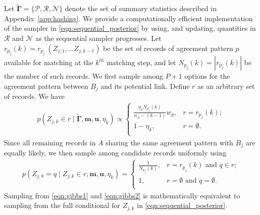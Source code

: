 \documentclass[12pt,letterpaper]{article}
\newcommand{\1}[1]{\mathbb{I}\!\left[#1\right]} %
\begin{document}
Let $\tilde{\bm{\Gamma}}=\{ \mathcal{P}, \mathcal{R},\mathcal{N}\}$ denote the set of summary statistics described in Appendix~\ref{app:hashing}. We provide a computationally efficient implementation of the sampler in \eqref{eqn:sequential_posterior} by using, and updating, quantities in $\mathcal{R}$ and $\mathcal{N}$ as the sequential sampler progresses. Let $r_{p_j}(k) = r_{p_j} \ (Z_{j, 1}, \ldots Z_{j, k-1})$ be the set of records of agreement pattern $p$ available for matching at the $k^{th}$ matching step, and let $N_{p_j}(k) = |r_{p_j}(k)|$ be the number of such records. We first sample among $P + 1$ options for the agreement pattern between $B_j$ and its potential link. Define $r$ as an arbitrary set of records. We have
\begin{align}
	\label{eqn:gibbs1}
	p\left( Z_{j, k} \in r \mid \tilde{\bm{\Gamma}}, \bm{m}, \bm{u}, \eta_k \right) \propto
	\begin{cases} 
		\frac{\eta_k N_{p_j}(k)}{n_A - (k - 1)}  w_{p},  & r = r_{p_j}(k); \\
		1- \eta_k , &  r = \emptyset. \\
	\end{cases}
\end{align}
Since all remaining records in $A$ sharing the same agreement pattern with $B_j$ are equally likely, we then sample among candidate records uniformly using
\begin{align}
	\label{eqn:gibbs2}
	p\left(Z_{j, k} = q \mid Z_{j, k} \in r, \bm{m}, \bm{u}, \eta_k \right) = \begin{cases} 
		\frac{1}{N_{p_j}(k)}, & r = r_{p_j}(k) \text{ and } q \in r; \\
		1, & r = \emptyset \text{ and } q = \emptyset. \\
	\end{cases}
\end{align}
Sampling from \eqref{eqn:gibbs1} and \eqref{eqn:gibbs2} is mathematically equivalent to sampling from the full conditional for $Z_{j,k}$ in \eqref{eqn:sequential_posterior}.

\end{document}
